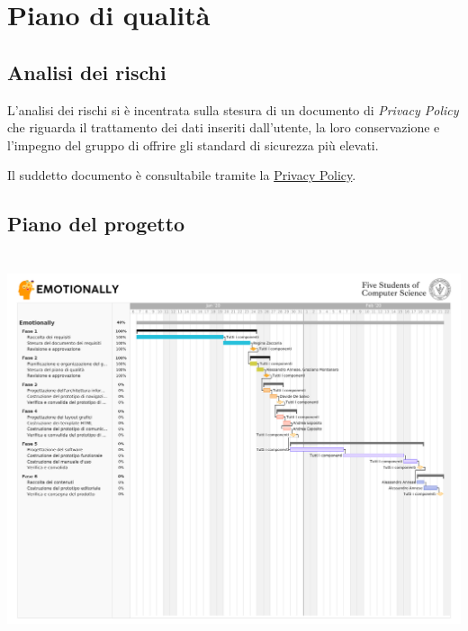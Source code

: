 
\chapter{Piano di qualità}\label{chap:piano-qualita}

\section{Analisi dei rischi}\label{sec:analisi-rischi}
L'analisi dei rischi si è incentrata sulla stesura di un documento di 
\textit{Privacy Policy} che riguarda il trattamento dei dati inseriti 
dall'utente, la loro conservazione e l'impegno del gruppo di offrire gli 
standard di sicurezza più elevati. 

Il suddetto documento è consultabile tramite la 
\href{https://f-s-c.github.io/emotionally_policy/privacy_policy.html}{Privacy 
Policy}.

\section{Piano del progetto}\label{sec:piano-progetto}
\includegraphics[height=11.5cm, frame]{images/gantt.png}

